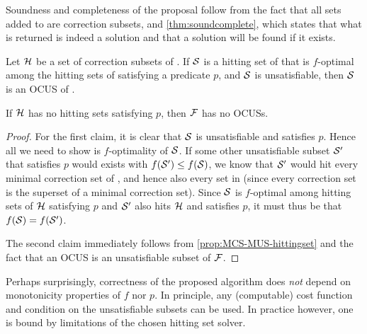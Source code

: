Soundness and completeness of the proposal follow from the fact that all sets added to \setstohit are correction subsets, and \cref{thm:soundcomplete}, which states that what is returned is indeed a solution and that a solution will be found if it exists. 
 
\begin{theorem}\label{thm:soundcomplete}
  Let $\mathcal{H}$ be a set of correction subsets of \mcses{\formula}. 
  If $\mathcal{S}$ is a hitting set of  that is $f$-optimal among the hitting sets of  satisfying a predicate $p$, and  $\mathcal{S}$ is unsatisfiable, then $\mathcal{S}$ is an OCUS of \formula. 
  
  If  $\mathcal{H}$ has no hitting sets satisfying $p$, then $\mathcal{F} $ has no OCUSs.
\end{theorem}
\begin{proof}
For the first claim, it is clear that $\mathcal{S}$ is unsatisfiable and satisfies $p$. Hence all we need to show is $f$-optimality of $\mathcal{S}$.
  If some other unsatisfiable subset $\mathcal{S}'$ that satisfies $p$ would exists with $f(\mathcal{S}')\leq f(\mathcal{S})$, we know that $\mathcal{S}'$ would hit every minimal correction set of , and hence also every set in  (since every correction set is the superset of a minimal correction set).
  Since $\mathcal{S}$ is $f$-optimal among hitting sets of $\mathcal{H}$ satisfying $p$ and $\mathcal{S}'$ also hits $\mathcal{H}$ and satisfies $p$, it must thus be that $f(\mathcal{S})=f(\mathcal{S}')$. 
%  

The second claim immediately follows from \cref{prop:MCS-MUS-hittingset} and the fact that an OCUS is an unsatisfiable subset of $\mathcal{F} $. 
\end{proof}
% 
% 
Perhaps surprisingly, correctness of the proposed algorithm does \emph{not} depend on monotonicity properties of $f$ nor $p$. In principle, any (computable) cost function and condition on the unsatisfiable subsets can be used. In practice however, one is bound by limitations of the chosen hitting set solver. 



